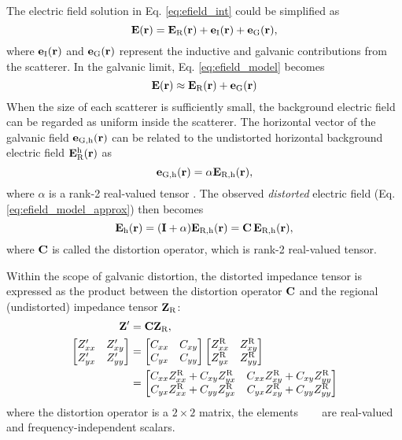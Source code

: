 				
			The electric field solution in Eq. \eqref{eq:efield_int} could be simplified as 
			\begin{equation}\label{eq:efield_model}
				\Ebf\fxr = \Ebf_\Regional\fxr + \mbf{e}_\text{I}\fxr + \mbf{e}_\text{G}\fxr,
			\end{equation}
			where $\mathbf{e}_\text{I}(\mathbf{r})$ and $\mathbf{e}_\text{G}(\mathbf{r})$ represent the inductive and galvanic contributions from the scatterer. In the galvanic limit, Eq. \eqref{eq:efield_model} becomes
			\begin{equation}\label{eq:efield_model_approx}
				\Ebf\fxr \approx  \Ebf_\Regional\fxr  + \mbf{e}_\text{G}\fxr
			\end{equation}
			When the size of each scatterer is sufficiently small, the background electric field can be regarded as uniform inside the scatterer. The horizontal vector of the galvanic field $\mathbf{e}_{\text{G},\text{h}}(\mathbf{r})$ can be related to the undistorted horizontal background electric field $\mathbf{E}_{\text{R}}^\text{h}(\mathbf{r})$ as
			\begin{equation}
				\mathbf{e}_{\text{G},\text{h}}(\mathbf{r})=\alpha \mathbf{E}_{\text{R},\text{h}}(\mathbf{r}),
			\end{equation}
			where $\alpha$ is a rank-2 real-valued tensor \citep[see][]{chave1994a}.
			The observed \emph{distorted} electric field (Eq. \ref{eq:efield_model_approx}) then becomes
			\begin{equation}
				\mathbf{E}_\text{h}(\mathbf{r}) =  (\mathbf{I}  + \alpha) \mathbf{E}_{\text{R},\text{h}}(\mathbf{r}) = \mathbf{C}\,\mathbf{E}_{\text{R},\text{h}}(\mathbf{r}),
			\end{equation}
			where $\mathbf{C}$ is called the distortion operator, which is rank-2 real-valued tensor.
						

			
		Within the scope of galvanic distortion, the distorted impedance tensor is expressed as the product between the distortion operator $\mathbf{C}$ and the regional (undistorted) impedance tensor $\mathbf{Z}_{\text{R}}$:
		\begin{equation}\label{eq:z_distorted}
		\begin{split}
			\ZbfDistorted & =\Cbf\ZbfUndistorted, \\
			\ZDistortedMatrix & = \CMatrix\ZMatrixUndistorted \\
				& = \begin{bmatrix} 
						\Cxx\ZxxR + \Cxy\ZyxR & \Cxx\ZxyR + \Cxy\ZyyR \\
						\Cyx\ZxxR + \Cyy\ZyxR & \Cyx\ZxyR + \Cyy\ZyyR
					\end{bmatrix}
		\end{split}
		\end{equation}
		where the distortion operator {\Cbf} is a $2\times2$ matrix, the elements {\Cxx\ \Cxy\ \Cyx\ \Cyy} are real-valued and frequency-independent scalars.



